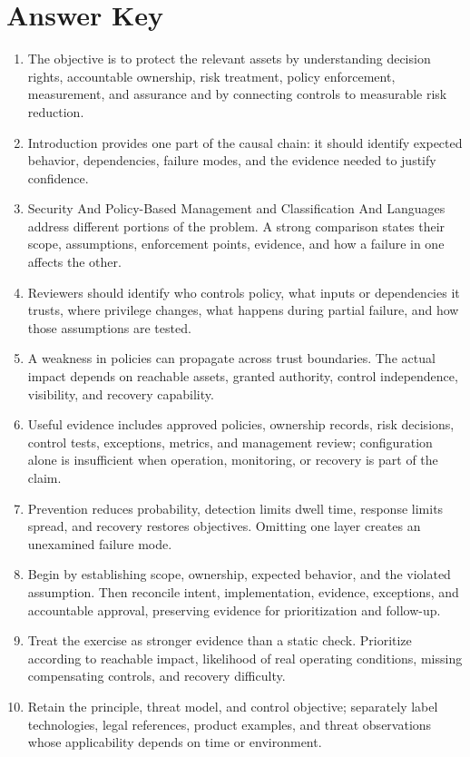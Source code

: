 \documentclass[11pt,letterpaper]{article}
\begin{document}
\section*{Answer Key}
\begin{enumerate}
\item The objective is to protect the relevant assets by understanding decision rights, accountable ownership, risk treatment, policy enforcement, measurement, and assurance and by connecting controls to measurable risk reduction.
\item Introduction provides one part of the causal chain: it should identify expected behavior, dependencies, failure modes, and the evidence needed to justify confidence.
\item Security And Policy-Based Management and Classification And Languages address different portions of the problem. A strong comparison states their scope, assumptions, enforcement points, evidence, and how a failure in one affects the other.
\item Reviewers should identify who controls policy, what inputs or dependencies it trusts, where privilege changes, what happens during partial failure, and how those assumptions are tested.
\item A weakness in policies can propagate across trust boundaries. The actual impact depends on reachable assets, granted authority, control independence, visibility, and recovery capability.
\item Useful evidence includes approved policies, ownership records, risk decisions, control tests, exceptions, metrics, and management review; configuration alone is insufficient when operation, monitoring, or recovery is part of the claim.
\item Prevention reduces probability, detection limits dwell time, response limits spread, and recovery restores objectives. Omitting one layer creates an unexamined failure mode.
\item Begin by establishing scope, ownership, expected behavior, and the violated assumption. Then reconcile intent, implementation, evidence, exceptions, and accountable approval, preserving evidence for prioritization and follow-up.
\item Treat the exercise as stronger evidence than a static check. Prioritize according to reachable impact, likelihood of real operating conditions, missing compensating controls, and recovery difficulty.
\item Retain the principle, threat model, and control objective; separately label technologies, legal references, product examples, and threat observations whose applicability depends on time or environment.
\end{enumerate}
\end{document}
